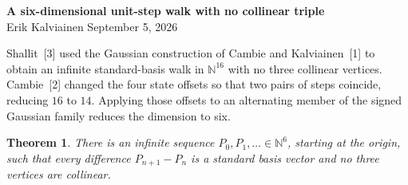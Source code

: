 \documentclass[9pt]{extarticle}
\newtheorem{theorem}{Theorem}
\newcommand{\N}{\mathbb N}
\begin{document}
\begin{center}
{\large\bfseries A six-dimensional unit-step walk with no collinear triple}\\[-1pt]
{\small Erik Kalviainen \quad September 5, 2026}
\end{center}
\vspace{-5pt}

Shallit~[3] used the Gaussian construction of Cambie and Kalviainen~[1] to obtain an infinite standard-basis walk in $\N^{16}$ with no three collinear vertices.  Cambie~[2] changed the four state offsets so that two pairs of steps coincide, reducing $16$ to $14$.  Applying those offsets to an alternating member of the signed Gaussian family reduces the dimension to six.

\begin{theorem}
There is an infinite sequence $P_0,P_1,\ldots\in\N^6$, starting at the origin, such that every difference $P_{n+1}-P_n$ is a standard basis vector and no three vertices are collinear.
\end{theorem}
\end{document}
